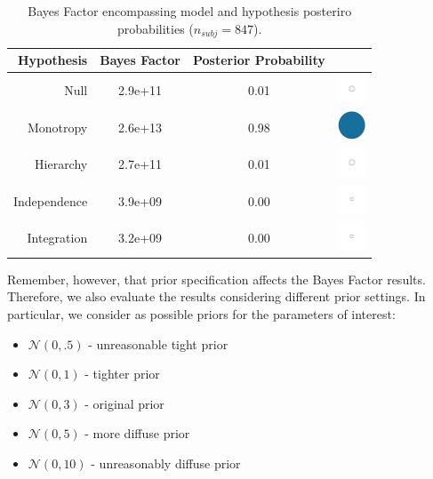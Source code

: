 \documentclass[
]{book}
\providecommand{\tightlist}{%
  \setlength{\itemsep}{0pt}\setlength{\parskip}{0pt}}
\begin{document}
\begin{table}[!h]

\caption{\label{tab:table-bf-results-ext}Bayes Factor encompassing model and hypothesis posteriro probabilities  ($n_{subj} = 847$).}
\centering
\begin{tabular}[t]{rcc>{\centering\arraybackslash}m{1cm}}
\toprule
\textbf{Hypothesis} & \textbf{Bayes Factor} & \textbf{Posterior Probability} & \textbf{ }\\
\midrule
Null & 2.9e+11 & 0.01 & \includegraphics[width=0.33in, height=0.33in]{images/ball_BF_ext_null.png}\\
Monotropy & 2.6e+13 & 0.98 & \includegraphics[width=0.33in, height=0.33in]{images/ball_BF_ext_monotropy.png}\\
Hierarchy & 2.7e+11 & 0.01 & \includegraphics[width=0.33in, height=0.33in]{images/ball_BF_ext_hierarchy.png}\\
Independence & 3.9e+09 & 0.00 & \includegraphics[width=0.33in, height=0.33in]{images/ball_BF_ext_independence.png}\\
Integration & 3.2e+09 & 0.00 & \includegraphics[width=0.33in, height=0.33in]{images/ball_BF_ext_integration.png}\\
\bottomrule
\end{tabular}
\end{table}

Remember, however, that prior specification affects the Bayes Factor results. Therefore, we also evaluate the results considering different prior settings. In particular, we consider as possible priors for the parameters of interest:

\begin{itemize}
\tightlist
\item
  \(\mathcal{N}(0,.5)\) - unreasonable tight prior
\item
  \(\mathcal{N}(0,1)\) - tighter prior
\item
  \(\mathcal{N}(0,3)\) - original prior
\item
  \(\mathcal{N}(0,5)\) - more diffuse prior
\item
  \(\mathcal{N}(0,10)\) - unreasonably diffuse prior
\end{itemize}
\end{document}
